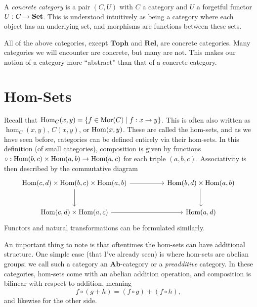 \begin{definition}\label{dfn:1.11}
	A \emph{concrete category} is a pair $(C,U)$ with $C$ a category and $U$ a forgetful functor $U : C \to \mathbf{Set} $. This is understood intuitively as being a category where each object has an underlying set, and morphisms are functions between these sets.
\end{definition}

All of the above categories, except $\mathbf{Toph} $ and $\mathbf{Rel} $, are concrete categories. Many categories we will encounter are concrete, but many are not. This makes our notion of a category more ``abstract'' than that of a concrete category.

\section{Hom-Sets}

Recall that $\operatorname{Hom}_{C}(x, y) =\left\{ f\in \operatorname{Mor} (C)\mid f : x \to y \right\} $. This is often also written as $\operatorname{hom}_C(x,y)$, $C(x,y)$, or $\operatorname{Hom}(x, y) $. These are called the hom-sets, and as we have seen before, categories can be defined entirely via their hom-sets. In this definition (of small categories), composition is given by functions $\circ : \operatorname{Hom}(b, c) \times \operatorname{Hom}(a, b) \to \operatorname{Hom}(a, c) $ for each triple $(a,b,c)$. Associativity is then described by the commutative diagram
\[\begin{tikzcd}[row sep = 2.5em, column sep = 2.5em]
\Hom(c, d) \times \Hom(b, c) \times \Hom(a, b) \ar[rr] \ar[d]  &  & \Hom(b, d) \times \Hom(a, b) \ar[d]  \\
\Hom(c, d) \times \Hom(a, c) \ar[rr]  &  & \Hom(a, d) 
\end{tikzcd}\]
Functors and natural transformations can be formulated similarly.

An important thing to note is that oftentimes the hom-sets can have additional structure. One simple case (that I've already seen) is where hom-sets are abelian groups; we call such a category an $\mathbf{Ab} $-category or a \emph{preadditive} category. In these categories, hom-sets come with an abelian addition operation, and composition is bilinear with respect to addition, meaning
\[
	f\circ (g+h)=(f\circ g)+(f\circ h),
\]
and likewise for the other side.

